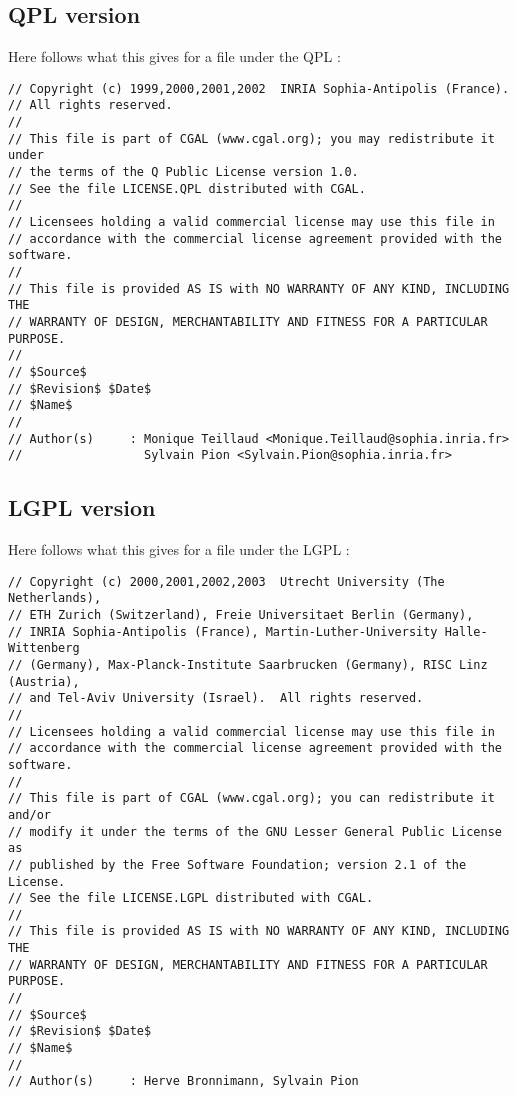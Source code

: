 \subsection*{QPL version}

Here follows what this gives for a file under the QPL :

\begin{verbatim}
// Copyright (c) 1999,2000,2001,2002  INRIA Sophia-Antipolis (France).
// All rights reserved.
//
// This file is part of CGAL (www.cgal.org); you may redistribute it under
// the terms of the Q Public License version 1.0.
// See the file LICENSE.QPL distributed with CGAL.
//
// Licensees holding a valid commercial license may use this file in
// accordance with the commercial license agreement provided with the software.
//
// This file is provided AS IS with NO WARRANTY OF ANY KIND, INCLUDING THE
// WARRANTY OF DESIGN, MERCHANTABILITY AND FITNESS FOR A PARTICULAR PURPOSE.
//
// $Source$
// $Revision$ $Date$
// $Name$
//
// Author(s)     : Monique Teillaud <Monique.Teillaud@sophia.inria.fr>
//                 Sylvain Pion <Sylvain.Pion@sophia.inria.fr>
\end{verbatim}

\subsection*{LGPL version}

Here follows what this gives for a file under the LGPL :

\begin{verbatim}
// Copyright (c) 2000,2001,2002,2003  Utrecht University (The Netherlands),
// ETH Zurich (Switzerland), Freie Universitaet Berlin (Germany),
// INRIA Sophia-Antipolis (France), Martin-Luther-University Halle-Wittenberg
// (Germany), Max-Planck-Institute Saarbrucken (Germany), RISC Linz (Austria),
// and Tel-Aviv University (Israel).  All rights reserved.
//
// Licensees holding a valid commercial license may use this file in
// accordance with the commercial license agreement provided with the software.
//
// This file is part of CGAL (www.cgal.org); you can redistribute it and/or
// modify it under the terms of the GNU Lesser General Public License as
// published by the Free Software Foundation; version 2.1 of the License.
// See the file LICENSE.LGPL distributed with CGAL.
//
// This file is provided AS IS with NO WARRANTY OF ANY KIND, INCLUDING THE
// WARRANTY OF DESIGN, MERCHANTABILITY AND FITNESS FOR A PARTICULAR PURPOSE.
//
// $Source$
// $Revision$ $Date$
// $Name$
//
// Author(s)     : Herve Bronnimann, Sylvain Pion
\end{verbatim}


